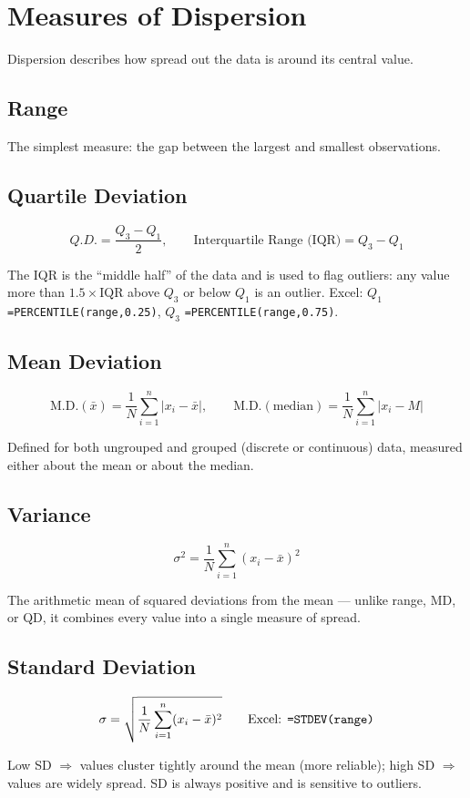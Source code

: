 \documentclass[11pt]{article}
\begin{document}
	\section{Measures of Dispersion}
	
	Dispersion describes how spread out the data is around its central value.
	
	\subsection{Range}
	The simplest measure: the gap between the largest and smallest observations.
	
	\subsection{Quartile Deviation}
	\begin{formulabox}
		\[
		Q.D. = \frac{Q_3 - Q_1}{2}, \qquad \text{Interquartile Range (IQR)} = Q_3 - Q_1
		\]
	\end{formulabox}
	The IQR is the ``middle half'' of the data and is used to flag outliers: any value more than $1.5 \times \text{IQR}$ above $Q_3$ or below $Q_1$ is an outlier.
	Excel: $Q_1$ \texttt{=PERCENTILE(range,0.25)}, $Q_3$ \texttt{=PERCENTILE(range,0.75)}.
	
	\subsection{Mean Deviation}
	\begin{formulabox}
		\[
		\text{M.D.}(\bar{x}) = \frac{1}{N}\sum_{i=1}^n |x_i - \bar{x}|, \qquad \text{M.D.}(\text{median}) = \frac{1}{N}\sum_{i=1}^n |x_i - M|
		\]
	\end{formulabox}
	Defined for both ungrouped and grouped (discrete or continuous) data, measured either about the mean or about the median.
	
	\subsection{Variance}
	\begin{formulabox}
		\[
		\sigma^2 = \frac{1}{N}\sum_{i=1}^n (x_i - \bar{x})^2
		\]
	\end{formulabox}
	The arithmetic mean of squared deviations from the mean --- unlike range, MD, or QD, it combines every value into a single measure of spread.
	
	\subsection{Standard Deviation}
	\begin{formulabox}
		\[
		\sigma = \sqrt{\frac{1}{N}\sum_{i=1}^n (x_i - \bar{x})^2} \qquad \text{Excel: \texttt{=STDEV(range)}}
		\]
	\end{formulabox}
	Low SD $\Rightarrow$ values cluster tightly around the mean (more reliable); high SD $\Rightarrow$ values are widely spread. SD is always positive and is sensitive to outliers.
	
\end{document}
